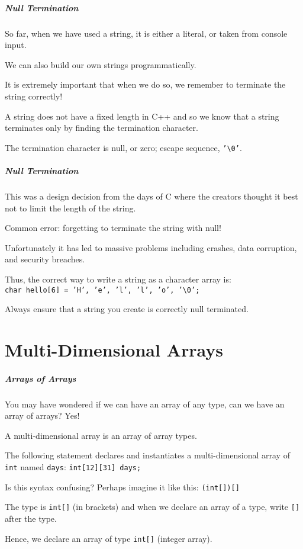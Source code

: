 \begin{frame}
\frametitle{Null Termination}

So far, when we have used a string, it is either a literal, or taken from console input.

We can also build our own strings programmatically.

It is extremely important that when we do so, we remember to terminate the string correctly!

A string does not have a fixed length in C++ and so we know that a string terminates only by finding the termination character.

The termination character is null, or zero; escape sequence, \texttt{'\textbackslash0'}.

\end{frame}




\begin{frame}
\frametitle{Null Termination}

This was a design decision from the days of C where the creators thought it best not to limit the length of the string.

Common error: forgetting to terminate the string with null!

Unfortunately it has led to massive problems including crashes, data corruption, and security breaches.

Thus, the correct way to write a string as a character array is:\\
\quad \texttt{char hello[6] = {'H', 'e', 'l', 'l', 'o', '\textbackslash0'};}

Always ensure that a string you create is correctly null terminated.

\end{frame}

\part{Multi-Dimensional Arrays}
\begin{frame}\partpage\end{frame}

\begin{frame}
\frametitle{Arrays of Arrays}

You may have wondered if we can have an array of any type, can we have an array of arrays? Yes!

A \alert{multi-dimensional array} is an array of array types.

The following statement declares and instantiates a multi-dimensional array of \texttt{int} named \texttt{days}: \texttt{int[12][31] days;}

Is this syntax confusing? Perhaps imagine it like this: \texttt{(int[])[]}

The type is \texttt{int[]} (in brackets) and when we declare an array of a type, write \texttt{[]} after the type.

Hence, we declare an array of type \texttt{int[]} (integer array).

\end{frame}

